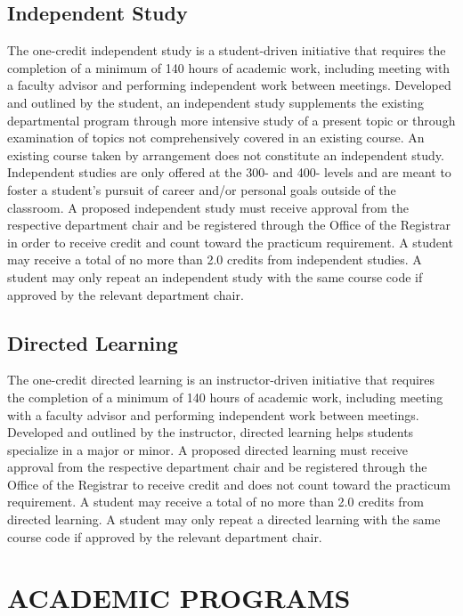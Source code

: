 \documentclass[
  letterpaper,
]{scrbook}
\begin{document}
\section{Independent Study}\label{independent-study}

The one-credit independent study is a student-driven initiative that
requires the completion of a minimum of 140 hours of academic work,
including meeting with a faculty advisor and performing independent work
between meetings. Developed and outlined by the student, an independent
study supplements the existing departmental program through more
intensive study of a present topic or through examination of topics not
comprehensively covered in an existing course. An existing course taken
by arrangement does not constitute an independent study. Independent
studies are only offered at the 300- and 400- levels and are meant to
foster a student's pursuit of career and/or personal goals outside of
the classroom. A proposed independent study must receive approval from
the respective department chair and be registered through the Office of
the Registrar in order to receive credit and count toward the practicum
requirement. A student may receive a total of no more than 2.0 credits
from independent studies. A student may only repeat an independent study
with the same course code if approved by the relevant department chair.

\section{Directed Learning}\label{directed-learning}

The one-credit directed learning is an instructor-driven initiative that
requires the completion of a minimum of 140 hours of academic work,
including meeting with a faculty advisor and performing independent work
between meetings. Developed and outlined by the instructor, directed
learning helps students specialize in a major or minor. A proposed
directed learning must receive approval from the respective department
chair and be registered through the Office of the Registrar to receive
credit and does not count toward the practicum requirement. A student
may receive a total of no more than 2.0 credits from directed learning.
A student may only repeat a directed learning with the same course code
if approved by the relevant department chair.

\chapter{ACADEMIC PROGRAMS}\label{academic-programs}
\end{document}
